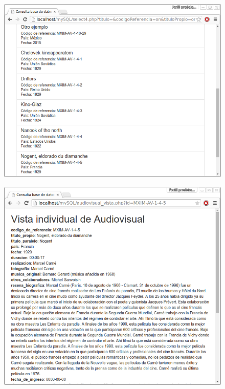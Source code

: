 \documentclass{beamer}
\begin{document}
\begin{frame}
	\begin{figure}[H]
		\centering
		\includegraphics[keepaspectratio=true,width=\linewidth]{Prototipo_03.png}
		\label{fig:prueba_formulario_2}
	\end{figure}
\end{frame}

\begin{frame}
	\begin{figure}[H]
		\centering
		\includegraphics[keepaspectratio=true,width=\linewidth]{Prototipo_04.png}
		\label{fig:prueba_formulario_2}
	\end{figure}	
\end{frame}
\end{document}
